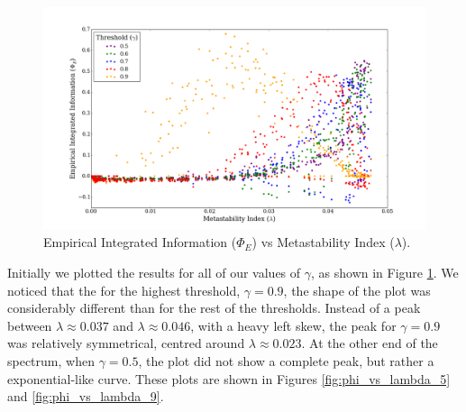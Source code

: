 \documentclass[a4paper,11pt]{article}
\begin{document}
\begin{figure}[H]
\begin{center}
\includegraphics[scale = 0.35]{figures/phi_vs_lambda_multi}
\caption{
	Empirical Integrated Information ($\Phi_E$) vs Metastability Index ($\lambda$).
	\label{fig:phi-vs-lambda-multi}
}
\end{center}
\end{figure}

Initially we plotted the results for all of our values of $\gamma$, as shown in Figure \ref{fig:phi-vs-lambda-multi}. We noticed that the for the highest threshold, $\gamma = 0.9$, the shape of the plot was considerably different than for the rest of the thresholds. Instead of a peak between $\lambda \approx 0.037$ and $\lambda \approx 0.046$, with a  heavy left skew, the peak for $\gamma = 0.9$ was relatively symmetrical, centred around $\lambda \approx 0.023$. At the other end of the spectrum, when $\gamma = 0.5$, the plot did not show a complete peak, but rather a exponential-like curve. These plots are shown in Figures \ref{fig:phi_vs_lambda_5} and \ref{fig:phi_vs_lambda_9}.
\end{document}
